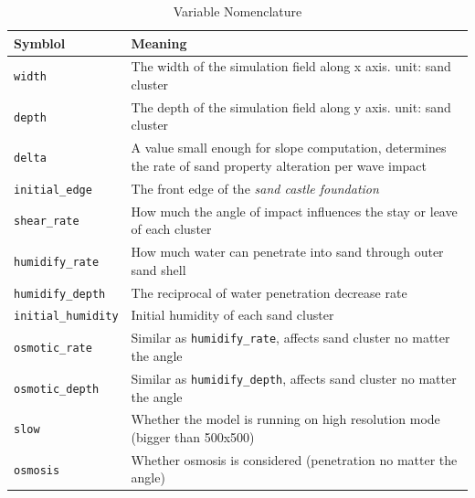 \documentclass[12pt]{article}
\begin{document}
\begin{table}[H]
    \caption{Variable Nomenclature}
    \vspace{10pt}
    \centering
    \begin{tabular}{p{3cm}p{12cm}}
        \hline
        \textbf{Symblol}           & \textbf{Meaning}                                                                                            \\
        \hline
        \texttt{width}             & The width of the simulation field along x axis. unit: sand cluster                                          \\
        \texttt{depth}             & The depth of the simulation field along y axis. unit: sand cluster                                          \\
        \texttt{delta}             & A value small enough for slope computation, determines the rate of sand property alteration per wave impact \\
        \texttt{initial\_edge}     & The front edge of the \textit{sand castle foundation}                                                       \\
        \texttt{shear\_rate}       & How much the angle of impact influences the stay or leave of each cluster                                   \\
        \texttt{humidify\_rate}    & How much water can penetrate into sand through outer sand shell                                             \\
        \texttt{humidify\_depth}   & The reciprocal of water penetration decrease rate                                                           \\
        \texttt{initial\_humidity} & Initial humidity of each sand cluster                                                                       \\
        \texttt{osmotic\_rate}     & Similar as \texttt{humidify\_rate}, affects sand cluster no matter the angle                                \\
        \texttt{osmotic\_depth}    & Similar as \texttt{humidify\_depth}, affects sand cluster no matter the angle                               \\
        \texttt{slow}              & Whether the model is running on high resolution mode (bigger than 500x500)                                  \\
        \texttt{osmosis}           & Whether osmosis is considered (penetration no matter the angle)                                             \\
        \hline
    \end{tabular}
    \label{tab:top_view_nomenclature}
\end{table}
\end{document}

